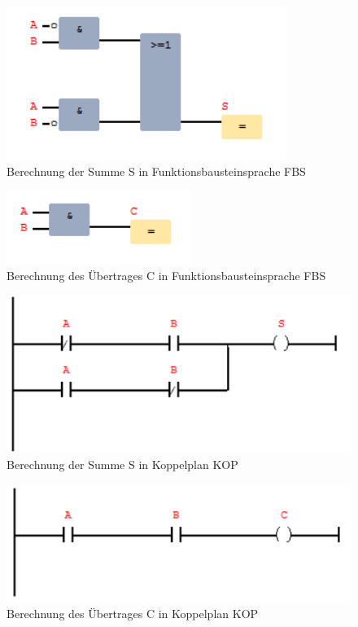 \documentclass[12pt,a4paper,ngerman]{article}
\begin{document}
\begin{figure}[h!]
\centering
\includegraphics[scale=1]{figures/Aufg6_S_FUP.png} 
\caption{Berechnung der Summe S in Funktionsbausteinsprache FBS}
\end{figure}

\begin{figure}[h!]
\centering
\includegraphics[scale=1]{figures/Aufg6_C_FUP.png} 
\caption{Berechnung des Übertrages C in Funktionsbausteinsprache FBS}
\end{figure}

\begin{figure}[h!]
\centering
\includegraphics[scale=1]{figures/Aufg6_S_KOP.png} 
\caption{Berechnung der Summe S in Koppelplan KOP}
\end{figure}

\begin{figure}[h!]
\centering
\includegraphics[scale=1]{figures/Aufg6_C_KOP.png} 
\caption{Berechnung des Übertrages C in Koppelplan KOP}
\end{figure}
\end{document}
